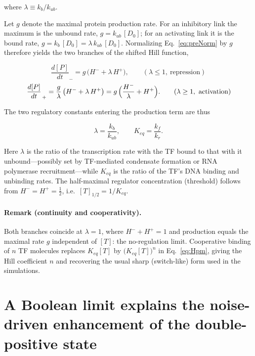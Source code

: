\documentclass[11pt]{article}
\begin{document}
where $\lambda \equiv k_b / k_{ub}$.

Let $g$ denote the maximal protein production rate. For an inhibitory link the
maximum is the unbound rate, $g = k_{ub}\,[D_0]$; for an activating link it is the
bound rate, $g = k_{b}\,[D_0] = \lambda\,k_{ub}\,[D_0]$. Normalizing
Eq.~\eqref{eq:preNorm} by $g$ therefore yields the two branches of the shifted
Hill function,

\begin{equation}
    \left.\frac{d[P]}{dt}\right._{-}
        = g\,\bigl(H^{-} + \lambda\,H^{+}\bigr),
    \qquad (\lambda \le 1,\ \text{repression})
    \label{eq:branchRep}
\end{equation}
\begin{equation}
    \left.\frac{d[P]}{dt}\right._{+}
        = \frac{g}{\lambda}\,\bigl(H^{-} + \lambda\,H^{+}\bigr)
        = g\,\Bigl(\frac{H^{-}}{\lambda} + H^{+}\Bigr).
    \qquad (\lambda \ge 1,\ \text{activation})
    \label{eq:branchAct}
\end{equation}

The two regulatory constants entering the production term are thus

\begin{equation}
    \lambda = \frac{k_b}{k_{ub}},
    \qquad
    K_{eq} = \frac{k_f}{k_r}.
\end{equation}

Here $\lambda$ is the ratio of the transcription rate with the TF bound to that
with it unbound---possibly set by TF-mediated condensate formation or RNA
polymerase recruitment---while $K_{eq}$ is the ratio of the TF's DNA binding and
unbinding rates. The half-maximal regulator concentration (threshold) follows
from $H^{-} = H^{+} = \tfrac{1}{2}$, i.e.\ $[T]_{1/2} = 1/K_{eq}$.

\paragraph{Remark (continuity and cooperativity).}
Both branches coincide at $\lambda = 1$, where $H^{-} + H^{+} = 1$ and production
equals the maximal rate $g$ independent of $[T]$: the no-regulation limit.
Cooperative binding of $n$ TF molecules replaces $K_{eq}[T]$ by
$\bigl(K_{eq}[T]\bigr)^{n}$ in Eq.~\eqref{eq:Hpm}, giving the Hill coefficient $n$
and recovering the usual sharp (switch-like) form used in the simulations. \newpage 
 \newpage \section{A Boolean limit explains the noise-driven enhancement of the double-positive state}
\label{sec:boolean}
\end{document}
